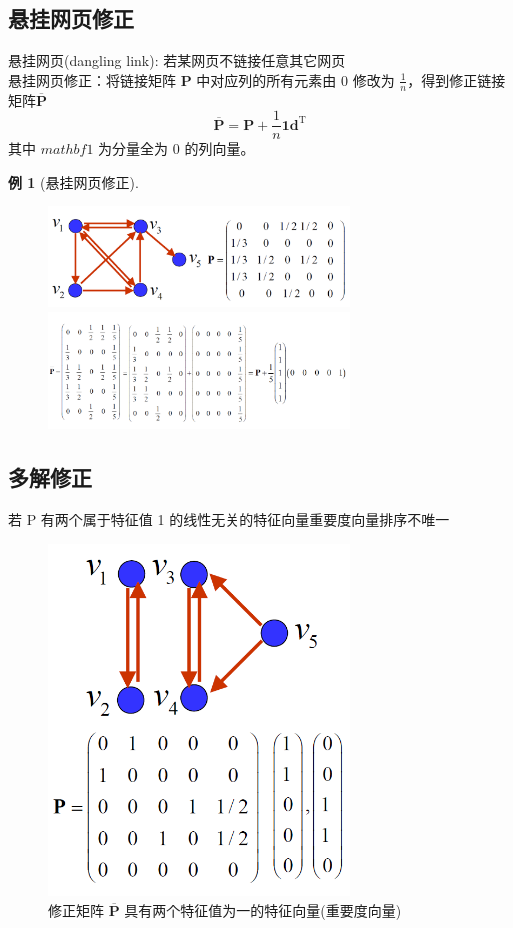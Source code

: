 \documentclass[12pt, a4paper, oneside]{ctexbook}
\newtheorem{example}[theorem]{例}
\begin{document}
\subsection{悬挂网页修正}
\noindent 悬挂网页(dangling link): 若某网页不链接任意其它网页\\
悬挂网页修正：将链接矩阵 $\mathbf{P}$ 中对应列的所有元素由 $0$ 修改为 $\frac{1}{n}$，得到修正链接矩阵$\overline{\mathbf{P}}$\\
$$\overline{\mathbf{P}}=\mathbf{P}+\frac1n\mathbf{1}\mathbf{d}^\mathrm{T}$$
其中 $mathbf{1}$ 为分量全为 $0$ 的列向量。
\begin{example}[悬挂网页修正]
    \begin{figure}[H]
        \centering
        \includegraphics[width = 8cm]{assets/修正矩阵-原矩阵.png}
        \includegraphics[width=8cm]{assets/修正矩阵-修正后矩阵.png}       
    \end{figure}
\end{example}
\subsection{多解修正}
若 P 有两个属于特征值 1 的线性无关的特征向量重要度向量排序不唯一\\
\begin{figure}[H]
    \centering
    \includegraphics[width = 8cm]{assets/两个特征向量的修正矩阵.png}
    \caption{修正矩阵 $\overline{\mathbf{P}}$ 具有两个特征值为一的特征向量(重要度向量)}  
\end{figure}
\end{document}
